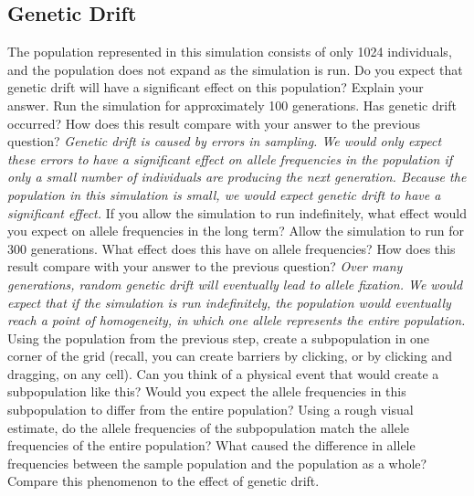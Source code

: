 \documentclass[12pt]{article}
\begin{document}
\begin{spacing}{1.5}
\subsection{Genetic Drift}
The population represented in this simulation consists of only 1024 individuals, and the population does not expand as the simulation is run. Do you expect that genetic drift will have a significant effect on this population? Explain your answer. Run the simulation for approximately 100 generations. Has genetic drift occurred? How does this result compare with your answer to the previous question?\newline
\newline
\textit{Genetic drift is caused by errors in sampling. We would only expect these errors to have a significant effect on allele frequencies in the population if only a small number of individuals are producing the next generation. Because the population in this simulation is small, we would expect genetic drift to have a significant effect.}\newline
\newline
If you allow the simulation to run indefinitely, what effect would you expect on allele frequencies in the long term? Allow the simulation to run for 300 generations. What effect does this have on allele frequencies? How does this result compare with your answer to the previous question?\newline
\newline
\textit{Over many generations, random genetic drift will eventually lead to allele fixation. We would expect that if the simulation is run indefinitely, the population would eventually reach a point of homogeneity, in which one allele represents the entire population.}\newline
\newline
Using the population from the previous step, create a subpopulation in one corner of the grid (recall, you can create barriers by clicking, or by clicking and dragging, on any cell). Can you think of a physical event that would create a subpopulation like this?
\newline
\newline
Would you expect the allele frequencies in this subpopulation to differ from the entire population? Using a rough visual estimate, do the allele frequencies of the subpopulation match the allele frequencies of the entire population?
\newline
\newline
What caused the difference in allele frequencies between the sample population and the population as a whole? Compare this phenomenon to the effect of genetic drift.\newline

\end{spacing}
\end{document}
